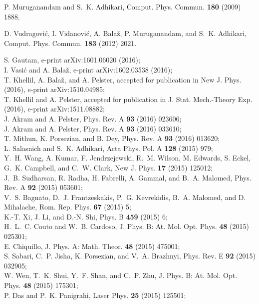 \documentclass[onecolumn,3p]{elsarticle}
\begin{document}
\begin{thebibliography}{5}

P. Muruganandam and S.~K. Adhikari, Comput. Phys. Commun. {\bf 180} (2009) 1888.

D. Vudragovi\' c, I. Vidanovi\' c, A. Bala\v z, P. Muruganandam, and S.~K. Adhikari, Comput. Phys. Commun. {\bf 183} (2012) 2021.

S. Gautam, e-print arXiv:1601.06020 (2016);\\
I. Vasi\'{c} and A. Bala\v{z}, e-print arXiv:1602.03538 (2016); \\
T. Khellil, A. Bala\v{z}, and A. Pelster, accepted for publication in New J. Phys. (2016), e-print arXiv:1510.04985;\\
T. Khellil and A. Pelster, accepted for publication in J. Stat. Mech.-Theory Exp. (2016), e-print arXiv:1511.08882;\\
J. Akram and A. Pelster, Phys. Rev. A {\bf 93} (2016) 023606; \\
 J. Akram and A. Pelster, Phys. Rev. A {\bf 93} (2016) 033610;\\
T. Mithun, K. Porsezian, and B. Dey, Phys. Rev. A {\bf 93} (2016) 013620; \\
L. Salasnich and S.~K. Adhikari, Acta Phys. Pol. A {\bf 128} (2015) 979;\\ 
Y.~H. Wang, A. Kumar, F. Jendrzejewski, R.~M. Wilson, M. Edwards, S. Eckel, G.~K. Campbell, and C.~W. Clark, New J. Phys. {\bf 17} (2015) 125012;\\
J.~B. Sudharsan, R. Radha, H. Fabrelli, A. Gammal, and B.~A. Malomed, Phys. Rev. A {\bf 92} (2015) 053601;\\ 
V.~S. Bagnato, D.~J. Frantzeskakis, P.~G. Kevrekidis, B.~A. Malomed, and D. Mihalache, Rom. Rep. Phys. {\bf 67} (2015) 5; \\
K.-T. Xi, J. Li, and D.-N. Shi, Phys. B {\bf 459} (2015) 6;\\
H.~L.~C. Couto and W.~B. Cardoso, J. Phys. B: At. Mol. Opt. Phys. {\bf 48} (2015) 025301;\\
E. Chiquillo, J. Phys. A: Math. Theor. {\bf 48} (2015) 475001;\\ 
S. Sabari, C.~P. Jisha, K. Porsezian, and V.~A. Brazhnyi, Phys. Rev. E {\bf 92} (2015) 032905;\\
W. Wen, T.~K. Shui, Y.~F. Shan, and C.~P. Zhu, J. Phys. B: At. Mol. Opt. Phys. {\bf 48} (2015) 175301;\\
P. Das and P.~K. Panigrahi, Laser Phys. {\bf 25} (2015) 125501;\\

\end{thebibliography}
\end{document}
